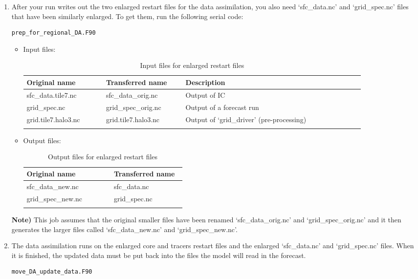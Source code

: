 \documentclass[11pt,fleqn]{report}              %
\begin{document}
\begin{enumerate}
\item After your run writes out the two enlarged restart files for the data assimilation, you also need `sfc\_data.nc' and `grid\_spec.nc' files that have been similarly enlarged. To get them, run the following serial code:
\lstset{language=bash}   
\begin{lstlisting}[frame=trBL]
prep_for_regional_DA.F90
\end{lstlisting}

\begin{itemize}
\item Input files:
{
\fontsize{10}{12}\selectfont
\begin{longtable}{p{0.2\linewidth} | p{0.2\linewidth} | p{0.45\linewidth}   }
\hline
\hline
 Original name & Transferred name & Description  \\
\hline
 sfc\_data.tile7.nc & sfc\_data\_orig.nc & Output of IC \\
 grid\_spec.nc & grid\_spec\_orig.nc & Output of a forecast run \\
 grid.tile7.halo3.nc & grid.tile7.halo3.nc & Output of `grid\_driver' (pre-processing)\\
\hline
\caption{Input files for enlarged restart files}
\label{table:fv3_dablend_en_restart_in}
\end{longtable}
}

\item Output files:
{
\fontsize{10}{12}\selectfont
\begin{longtable}{ p{0.2\linewidth} | p{0.2\linewidth}   }
\hline
\hline
 Original name & Transferred name \\
\hline
 sfc\_data\_new.nc & sfc\_data.nc \\
 grid\_spec\_new.nc & grid\_spec.nc  \\
\hline
\caption{Output files for enlarged restart files}
\label{table:fv3_dablend_en_restart_out}
\end{longtable}
}

\end{itemize}

{\bf Note)} This job assumes that the original smaller files have been renamed `sfc\_data\_orig.nc' and `grid\_spec\_orig.nc' and it then generates the larger files called `sfc\_data\_new.nc' and `grid\_spec\_new.nc'.

\item The data assimilation runs on the enlarged core and tracers restart files and the enlarged `sfc\_data.nc' and `grid\_spec.nc' files. When it is finished, the updated data must be put back into the files the model will read in the forecast. 
\lstset{language=bash}   
\begin{lstlisting}[frame=trBL]
move_DA_update_data.F90
\end{lstlisting}


\end{enumerate}
\end{document}
